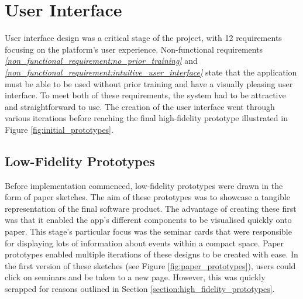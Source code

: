 \documentclass{l4proj}
\begin{document}
\section{User Interface}

User interface design was a critical stage of the project, with 12 requirements focusing on the platform's user experience. Non-functional requirements \emph{\ref{non_functional_requirement:no_prior_training}} and \emph{\ref{non_functional_requirement:intuitive_user_interface}} state that the application must be able to be used without prior training and have a visually pleasing user interface. To meet both of these requirements, the system had to be attractive and straightforward to use. The creation of the user interface went through various iterations before reaching the final high-fidelity prototype illustrated in Figure \ref{fig:initial_prototypes}.

\subsection{Low-Fidelity Prototypes}

Before implementation commenced, low-fidelity prototypes were drawn in the form of paper sketches. The aim of these prototypes was to showcase a tangible representation of the final software product. The advantage of creating these first was that it enabled the app's different components to be visualised quickly onto paper. This stage's particular focus was the seminar cards that were responsible for displaying lots of information about events within a compact space. Paper prototypes enabled multiple iterations of these designs to be created with ease. In the first version of these sketches (see Figure \ref{fig:paper_prototypes}), users could click on seminars and be taken to a new page. However, this was quickly scrapped for reasons outlined in Section \ref{section:high_fidelity_prototypes}. 
\end{document}
